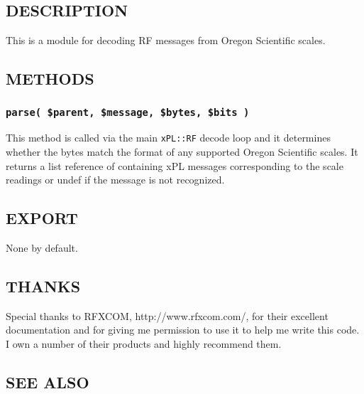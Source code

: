 \subsection*{DESCRIPTION\label{xPL::RF::OregonScale_DESCRIPTION}}


This is a module for decoding RF messages from Oregon Scientific scales.

\subsection*{METHODS\label{xPL::RF::OregonScale_METHODS}}
\subsubsection*{\texttt{parse( \$parent, \$message, \$bytes, \$bits )}\label{xPL::RF::OregonScale_parse_parent_message_bytes_bits_}}


This method is called via the main \texttt{xPL::RF} decode loop and it
determines whether the bytes match the format of any supported Oregon
Scientific scales.  It returns a list reference of containing xPL
messages corresponding to the scale readings or undef if the message
is not recognized.

\subsection*{EXPORT\label{xPL::RF::OregonScale_EXPORT}}


None by default.

\subsection*{THANKS\label{xPL::RF::OregonScale_THANKS}}


Special thanks to RFXCOM, \textsf{http://www.rfxcom.com/}, for their
excellent documentation and for giving me permission to use it to help
me write this code.  I own a number of their products and highly
recommend them.

\subsection*{SEE ALSO\label{xPL::RF::OregonScale_SEE_ALSO}}


